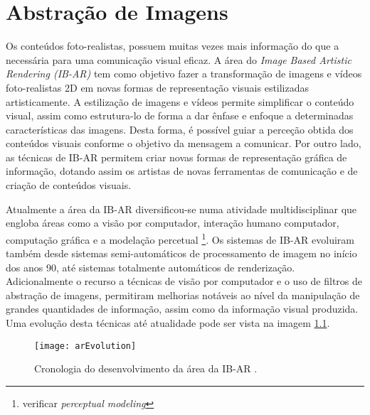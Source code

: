 \chapter{Abstração de Imagens} \label{chap:abstracao}

Os conteúdos foto-realistas, possuem muitas vezes mais informação do que a necessária para uma comunicação visual eficaz. A área do \textit{Image Based Artistic Rendering (IB-AR)} tem como objetivo fazer a transformação de imagens e vídeos foto-realistas 2D em novas formas de representação visuais estilizadas artisticamente. A estilização de imagens e vídeos permite simplificar o conteúdo visual, assim como estrutura-lo de forma a dar ênfase e enfoque a determinadas características das imagens. Desta forma, é possível guiar a perceção obtida dos conteúdos visuais conforme o objetivo da mensagem a comunicar. Por outro lado, as técnicas de IB-AR  permitem criar novas formas de representação gráfica de informação, dotando assim os artistas de novas ferramentas de comunicação e de criação de conteúdos visuais.

Atualmente a área da IB-AR diversificou-se numa atividade multidisciplinar que engloba áreas como a visão por computador, interação humano computador, computação gráfica e a modelação percetual \footnote{verificar \textit{perceptual modeling}}. Os sistemas de IB-AR evoluiram também desde sistemas semi-automáticos de processamento de imagem no início dos anos 90, até sistemas totalmente automáticos de renderização. Adicionalmente o recurso a técnicas de visão por computador e o uso de filtros de abstração de imagens, permitiram melhorias notáveis ao nível da manipulação de grandes quantidades de informação, assim como da informação visual produzida. Uma evolução desta técnicas até atualidade pode ser vista na imagem \ref{fig:arEvolution}.

\begin{figure}[ht]
  \begin{center}
    \leavevmode
    \texttt{[image: arEvolution]}
    \caption{Cronologia do desenvolvimento da área da IB-AR \cite{Kyprianidis2012}.}
    \label{fig:arEvolution}
  \end{center}
\end{figure}

